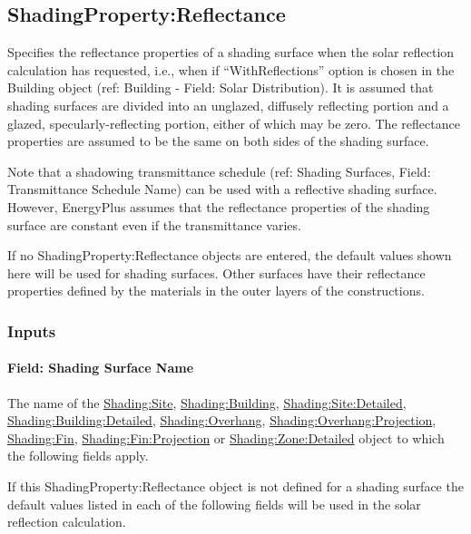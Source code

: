 \subsection{ShadingProperty:Reflectance}\label{shadingpropertyreflectance}

Specifies the reflectance properties of a shading surface when the solar reflection calculation has requested, i.e., when if ``WithReflections'' option is chosen in the Building object (ref: Building - Field: Solar Distribution). It is assumed that shading surfaces are divided into an unglazed, diffusely reflecting portion and a glazed, specularly-reflecting portion, either of which may be zero. The reflectance properties are assumed to be the same on both sides of the shading surface.

Note that a shadowing transmittance schedule (ref: Shading Surfaces, Field: Transmittance Schedule Name) can be used with a reflective shading surface. However, EnergyPlus assumes that the reflectance properties of the shading surface are constant even if the transmittance varies.

If no ShadingProperty:Reflectance objects are entered, the default values shown here will be used for shading surfaces. Other surfaces have their reflectance properties defined by the materials in the outer layers of the constructions.

\subsubsection{Inputs}\label{inputs-31-002}

\paragraph{Field: Shading Surface Name}\label{field-shading-surface-name}

The name of the \hyperref[shadingsite-shadingbuilding]{Shading:Site}, \hyperref[shadingsite-shadingbuilding]{Shading:Building}, \hyperref[shadingsitedetailed-shadingbuildingdetailed]{Shading:Site:Detailed}, \hyperref[shadingsitedetailed-shadingbuildingdetailed]{Shading:Building:Detailed}, \hyperref[shadingoverhang]{Shading:Overhang}, \hyperref[shadingoverhangprojection]{Shading:Overhang:Projection}, \hyperref[shadingfin]{Shading:Fin}, \hyperref[shadingfinprojection]{Shading:Fin:Projection} or \hyperref[shadingzonedetailed-000]{Shading:Zone:Detailed} object to which the following fields apply.

If this ShadingProperty:Reflectance object is not defined for a shading surface the default values listed in each of the following fields will be used in the solar reflection calculation.

